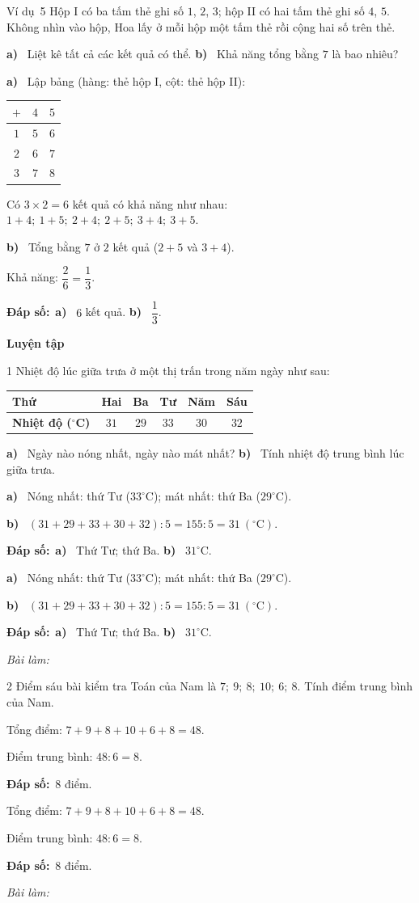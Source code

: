 \documentclass[11pt]{article}
\newif\ifsol \soltrue
\providecommand{\AnsWord}{Đáp số}
\newcommand{\dapso}[1]{\par\textbf{\AnsWord:}\ #1}
\newcommand{\guide}{\par\vspace{4pt}{\bfseries\color{tmBlue}\GuideWord}\par\vspace{3pt}\nopagebreak}
\newcommand{\probsol}[1]{%
  \begin{lrbox}{\solmeasure}\begin{minipage}{\dimexpr\linewidth-24pt\relax}#1\end{minipage}\end{lrbox}%
  \ifsol
    \begin{solbox}#1\end{solbox}%
  \else
    \setlength{\solht}{\dimexpr\ht\solmeasure+\dp\solmeasure+0.85cm\relax}%
    \ifdim\solht<1.35cm\setlength{\solht}{1.35cm}\fi
    \begin{tcolorbox}[colback=white,colframe=Line,boxrule=0.8pt,arc=5pt,
      left=8pt,right=8pt,top=4pt,bottom=4pt,height=\solht]{\footnotesize\color{Slate}\itshape\WorkWord}\end{tcolorbox}%
  \fi}
\newcommand{\dividerbar}[1]{\par\vspace{0.6em}\noindent
  \begin{tcolorbox}[enhanced,frame hidden,interior hidden,borderline west={5pt}{0pt}{ProbBlue},
    colback=white,left=12pt,right=12pt,top=5pt,bottom=5pt,arc=4pt]
  {\large\bfseries\color{ProbBlue} #1}\end{tcolorbox}\vspace{0.4em}}
\newcommand{\pa}[1]{\textbf{#1)}\ }
\newcommand{\gap}{\vspace{0.3cm}}
\def\GuideWord{Hướng dẫn giải.}
\def\WorkWord{Bài làm:}
\def\AnsWord{Đáp số}
\def\ExWord{Ví dụ}
\begin{document}
\begin{exbox}{\ExWord\ 5}
Hộp I có ba tấm thẻ ghi số $1$, $2$, $3$; hộp II có hai tấm thẻ ghi số $4$, $5$. Không nhìn vào hộp, Hoa lấy ở mỗi hộp một tấm thẻ rồi cộng hai số trên thẻ.\par
\pa{a} Liệt kê tất cả các kết quả có thể. \quad \pa{b} Khả năng tổng bằng $7$ là bao nhiêu?
\guide
\pa{a} Lập bảng (hàng: thẻ hộp I, cột: thẻ hộp II):
\begin{center}
\begin{tabular}{|c|c|c|}
\hline
$+$ & $4$ & $5$\\\hline
$1$ & $5$ & $6$\\\hline
$2$ & $6$ & $7$\\\hline
$3$ & $7$ & $8$\\\hline
\end{tabular}
\end{center}
Có $3\times2=6$ kết quả có khả năng như nhau: $1+4;\ 1+5;\ 2+4;\ 2+5;\ 3+4;\ 3+5$.\par
\pa{b} Tổng bằng $7$ ở $2$ kết quả ($2+5$ và $3+4$).\par Khả năng: $\dfrac26=\dfrac13$.
\dapso{\pa{a} $6$ kết quả. \pa{b} $\dfrac13$.}
\end{exbox}
\dividerbar{Luyện tập}
\needspace{5cm}
\begin{probbox}{1}{\relax}
Nhiệt độ lúc giữa trưa ở một thị trấn trong năm ngày như sau:
\begin{center}
\begin{tabular}{|l|c|c|c|c|c|}
\hline
\textbf{Thứ} & Hai & Ba & Tư & Năm & Sáu\\\hline
\textbf{Nhiệt độ ($^\circ$C)} & $31$ & $29$ & $33$ & $30$ & $32$\\\hline
\end{tabular}
\end{center}
\pa{a} Ngày nào nóng nhất, ngày nào mát nhất? \quad \pa{b} Tính nhiệt độ trung bình lúc giữa trưa.
\end{probbox}
\probsol{
\pa{a} Nóng nhất: thứ Tư ($33^\circ$C); mát nhất: thứ Ba ($29^\circ$C).\par
\pa{b} $(31+29+33+30+32):5=155:5=31\ (^\circ\text{C})$.
\dapso{\pa{a} Thứ Tư; thứ Ba. \pa{b} $31^\circ$C.}}
\gap
\begin{probbox}{2}{\relax}
Điểm sáu bài kiểm tra Toán của Nam là $7;\ 9;\ 8;\ 10;\ 6;\ 8$. Tính điểm trung bình của Nam.
\end{probbox}
\probsol{
Tổng điểm: $7+9+8+10+6+8=48$.\par Điểm trung bình: $48:6=8$.
\dapso{$8$ điểm.}}
\end{document}
